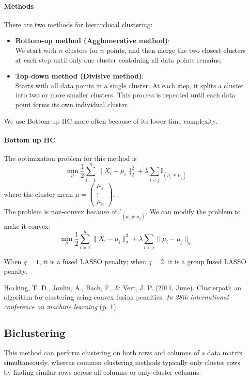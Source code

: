 \documentclass[12pt]{book}
\theoremstyle{definition}
\theoremstyle{remark}
\begin{document}
\paragraph{Methods}
There are two methods for hierarchical clustering:
\begin{itemize}
    \item \textbf{Bottom-up method (Agglomerative method)}: \\
    We start with $n$ clusters for $n$ points, and then merge the two closest clusters at each step until only one cluster containing all data points remains;
    \item \textbf{Top-down method (Divisive method)}:\\
    Starts with all data points in a single cluster. At each step, it splits a cluster into two or more smaller clusters. This process is repeated until each data point forms its own individual cluster.
\end{itemize}


We use Bottom-up HC more often because of its lower time complexity.

\paragraph{Bottom up HC}
The optimization problem for this method is 
\[\min_{\mu}\frac12\sum_{i=1}^n\|X_i - \mu_i\|_2^2+\lambda\sum_{i<j} \mathbb{I}_{(\mu_i \ne \mu_j)}\]
where the cluster mean $\mu = \begin{pmatrix}
    \mu_1\\\vdots\\\mu_n
\end{pmatrix}$.\\

The problem is non-convex because of $\mathbb{I}_{(\mu_i \ne \mu_j)}$. We can modify the problem to make it convex:
\[\min_{\mu}\frac12\sum_{i=1}^n\|X_i - \mu_i\|_2^2+\lambda\sum_{i<j} \|\mu_i - \mu_j\|_q\]

When $q = 1$, it is a fused LASSO penalty; when $q=2$, it is a group fused LASSO penalty.

\begin{referencebox}
    Hocking, T. D., Joulin, A., Bach, F., \& Vert, J. P. (2011, June). Clusterpath an algorithm for clustering using convex fusion penalties. \textit{In 28th international conference on machine learning} (p. 1).
\end{referencebox}

\subsection{Biclustering}
This method can perform clustering on both rows and columns of a data matrix simultaneously, whereas common clustering methods typically only cluster rows by finding similar rows across all columns or only cluster columns.
\end{document}
